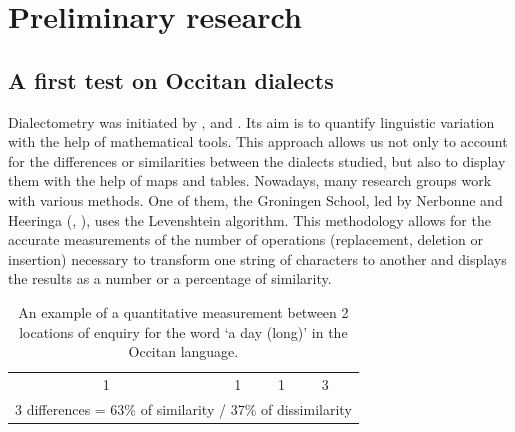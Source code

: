 \documentclass[output=paper]{LSP/langsci}
\begin{document}
\section{Preliminary research}

\subsection[A first test on Occitan dialects]{A first test on Occitan dialects}

Dialectometry was initiated by \citet{seguy_relation_1971,seguy_dialectometrie_1973}, and \citet{guiter_atlas_1973}. Its aim is to quantify linguistic variation with the help of mathematical tools. This approach allows us not only to account for the differences or similarities between the dialects studied, but also to display them with the help of maps and tables. Nowadays, many research groups work with various methods. One of them, the Groningen School, led by Nerbonne and Heeringa (\citealt{nerbonne_computational_2001,nerbonne_measuring_2010}, \citealt{heeringa_measuring_2004}), uses the Levenshtein algorithm. This methodology allows for the accurate measurements of the number of operations (replacement, deletion or insertion) necessary to transform one string of characters to another and displays the results as a number or a percentage of similarity.

\begin{table}
\begin{tabular}{llllllllll}
\lsptoprule
&  &  & 1 &  &  &  & 1 & 1 & 3\\
\multicolumn{10}{l}{ 3 differences = 63\% of similarity / 37\% of dissimilarity}\\
\end{tabular}
\caption{An example of a quantitative measurement between 2 locations of enquiry for the word ‘a day (long)’ in the Occitan language.}
\end{table}
\end{document}
